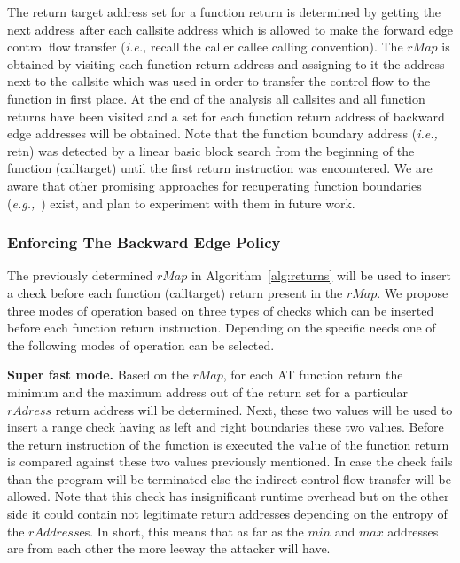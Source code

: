 The return target address set for a function return is determined by getting the next address after each callsite address 
which is allowed to make the forward edge control flow transfer
(\textit{i.e.,} recall the caller callee calling convention).
The $rMap$ is obtained by visiting each function return address and assigning to it the address next to the callsite
which was used in order to transfer the control flow to the function in first place. 
At the end of the analysis all callsites and all function returns have been visited and a set for each function return address of backward edge addresses will be obtained.
Note that the function boundary address (\textit{i.e.,} retn) was detected by a linear basic block search from the beginning of 
the function (calltarget) until the first return instruction was encountered. We are aware that other promising approaches for recuperating 
function boundaries (\textit{e.g.,}~\cite{function:boundary}) exist, and plan to experiment with them in future work.

\subsubsection{Enforcing The Backward Edge Policy}
The previously determined $rMap$ in Algorithm~\ref{alg:returns} will be used to insert a check before each 
function (calltarget) return present in the $rMap$. We propose three modes of operation based on three types
of checks which can be inserted before each function return instruction. Depending on the specific needs
one of the following modes of operation can be selected.

\textbf{Super fast mode.} Based on the $rMap$, for each AT function return the minimum and the maximum address out of the return set for a particular 
$rAdress$ return address will be determined. Next, these two values will be used to insert a range check having as left and right boundaries these
two values. Before the return instruction of the function is executed the value of the function return is compared against these two values previously
mentioned. In case the check fails than the program will be terminated else the indirect control flow transfer will be allowed.
Note that this check has insignificant runtime overhead but on the other side it could contain not legitimate return addresses depending 
on the entropy of the $rAddress$es. In short, this means that as far as the $min$ and $max$ addresses are from each other the more leeway the attacker will have. 

